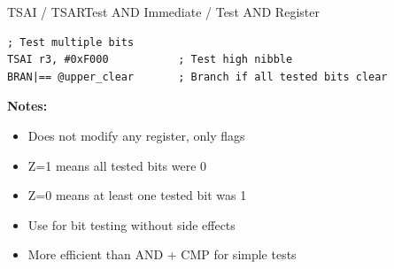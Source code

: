 \begin{instructionbox}{TSAI / TSAR}{Test AND Immediate / Test AND Register}
\begin{example}
\begin{lstlisting}
; Test multiple bits
TSAI r3, #0xF000           ; Test high nibble
BRAN|== @upper_clear       ; Branch if all tested bits clear
		\end{lstlisting}
		\caption{Bit Testing with TSA}
	\end{example}

	\textbf{Notes:}
	\begin{itemize}
		\item Does not modify any register, only flags
		\item Z=1 means all tested bits were 0
		\item Z=0 means at least one tested bit was 1
		\item Use for bit testing without side effects
		\item More efficient than AND + CMP for simple tests
	\end{itemize}
\end{instructionbox}

